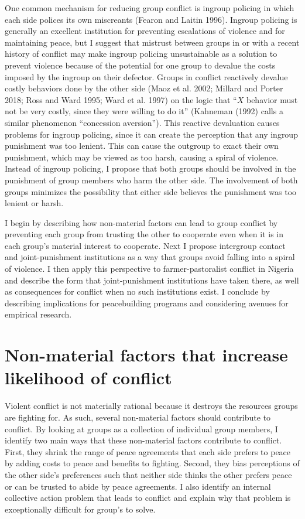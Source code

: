 \documentclass[11pt]{article}
\begin{document}
One common mechanism for reducing group conflict is ingroup policing in
which each side polices its own miscreants (Fearon and Laitin 1996).
Ingroup policing is generally an excellent institution for preventing
escalations of violence and for maintaining peace, but I suggest that
mistrust between groups in or with a recent history of conflict may make
ingroup policing unsustainable as a solution to prevent violence because
of the potential for one group to devalue the costs imposed by the
ingroup on their defector. Groups in conflict reactively devalue costly
behaviors done by the other side (Maoz et al. 2002; Millard and Porter
2018; Ross and Ward 1995; Ward et al. 1997) on the logic that ``\(X\)
behavior must not be very costly, since they were willing to do it''
(Kahneman (1992) calls a similar phenomenon ``concession aversion'').
This reactive devaluation causes problems for ingroup policing, since it
can create the perception that any ingroup punishment was too lenient.
This can cause the outgroup to exact their own punishment, which may be
viewed as too harsh, causing a spiral of violence. Instead of ingroup
policing, I propose that both groups should be involved in the
punishment of group members who harm the other side. The involvement of
both groups minimizes the possibility that either side believes the
punishment was too lenient or harsh.

I begin by describing how non-material factors can lead to group
conflict by preventing each group from trusting the other to cooperate
even when it is in each group's material interest to cooperate. Next I
propose intergroup contact and joint-punishment institutions as a way
that groups avoid falling into a spiral of violence. I then apply this
perspective to farmer-pastoralist conflict in Nigeria and describe the
form that joint-punishment institutions have taken there, as well as
consequences for conflict when no such institutions exist. I conclude by
describing implications for peacebuilding programs and considering
avenues for empirical research.

\hypertarget{non-material-factors-that-increase-likelihood-of-conflict}{%
\section{Non-material factors that increase likelihood of
conflict}\label{non-material-factors-that-increase-likelihood-of-conflict}}

Violent conflict is not materially rational because it destroys the
resources groups are fighting for. As such, several non-material factors
should contribute to conflict. By looking at groups as a collection of
individual group members, I identify two main ways that these
non-material factors contribute to conflict. First, they shrink the
range of peace agreements that each side prefers to peace by adding
costs to peace and benefits to fighting. Second, they bias perceptions
of the other side's preferences such that neither side thinks the other
prefers peace or can be trusted to abide by peace agreements. I also
identify an internal collective action problem that leads to conflict
and explain why that problem is exceptionally difficult for group's to
solve.
\end{document}
